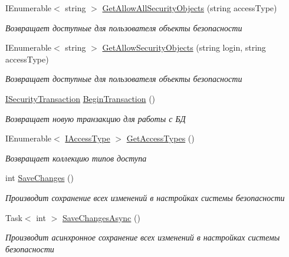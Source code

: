 \begin{DoxyCompactItemize}
I\+Enumerable$<$ string $>$ \hyperlink{interface_security_1_1_interfaces_1_1_i_security_aa7e5e1c0fdd2fe0e3a763750decbcffb}{Get\+Allow\+All\+Security\+Objects} (string access\+Type)
\begin{DoxyCompactList}\small\item\em Возвращает доступные для пользователя объекты безопасности \end{DoxyCompactList}\item 
I\+Enumerable$<$ string $>$ \hyperlink{interface_security_1_1_interfaces_1_1_i_security_aef63980964e18a05521826c46040c068}{Get\+Allow\+Security\+Objects} (string login, string access\+Type)
\begin{DoxyCompactList}\small\item\em Возвращает доступные для пользователя объекты безопасности \end{DoxyCompactList}\item 
\hyperlink{interface_security_1_1_interfaces_1_1_i_security_transaction}{I\+Security\+Transaction} \hyperlink{interface_security_1_1_interfaces_1_1_i_security_aaa904347683f2b6cac529738094112e1}{Begin\+Transaction} ()
\begin{DoxyCompactList}\small\item\em Возвращает новую транзакцию для работы с БД \end{DoxyCompactList}\item 
I\+Enumerable$<$ \hyperlink{interface_security_1_1_interfaces_1_1_model_1_1_i_access_type}{I\+Access\+Type} $>$ \hyperlink{interface_security_1_1_interfaces_1_1_i_security_a5057c425b04d1c75e8ca9c7b451a1ecf}{Get\+Access\+Types} ()
\begin{DoxyCompactList}\small\item\em Возвращает коллекцию типов доступа \end{DoxyCompactList}\item 
int \hyperlink{interface_security_1_1_interfaces_1_1_i_security_ac2cb6f1d06c0684886c94ed6ed88e7da}{Save\+Changes} ()
\begin{DoxyCompactList}\small\item\em Производит сохранение всех изменений в настройках системы безопасности \end{DoxyCompactList}\item 
Task$<$ int $>$ \hyperlink{interface_security_1_1_interfaces_1_1_i_security_a73465b9b858b22e2ec8497f903c8f49b}{Save\+Changes\+Async} ()
\begin{DoxyCompactList}\small\item\em Производит асинхронное сохранение всех изменений в настройках системы безопасности \end{DoxyCompactList}\end{DoxyCompactItemize}
